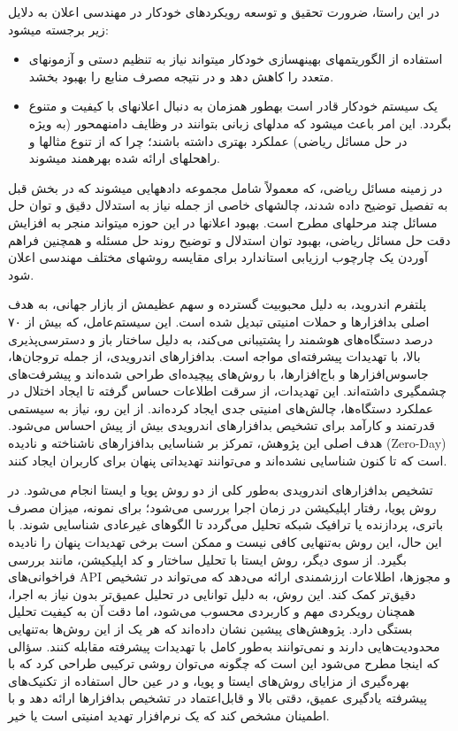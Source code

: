 در این راستا، ضرورت تحقیق و توسعه رویکردهای خودکار در مهندسی اعلان به دلایل زیر برجسته می\/شود:

\begin{itemize}
	\item استفاده از الگوریتم\/های بهینه\/سازی خودکار می\/تواند نیاز به تنظیم دستی و آزمون\/های متعدد را کاهش دهد و در نتیجه مصرف منابع را بهبود بخشد.
	\item یک سیستم خودکار قادر است به\/طور همزمان به دنبال اعلان\/های با کیفیت و متنوع بگردد. این امر باعث می\/شود که مدل\/های زبانی بتوانند در وظایف دامنه\/محور (به ویژه در حل مسائل ریاضی) عملکرد بهتری داشته باشند؛ چرا که از تنوع مثال\/ها و راه\/حل\/های ارائه شده بهره\/مند می\/شوند.
\end{itemize}

در زمینه مسائل ریاضی، که معمولاً شامل مجموعه داده\/هایی می\/شوند که در بخش قبل به تفصیل توضیح داده شدند، چالش\/های خاصی از جمله نیاز به استدلال دقیق و توان حل مسائل چند مرحله\/ای مطرح است. بهبود اعلان\/ها در این حوزه می\/تواند منجر به افزایش دقت حل مسائل ریاضی، بهبود توان استدلال و توضیح روند حل مسئله و همچنین فراهم آوردن یک چارچوب ارزیابی استاندارد برای مقایسه روش\/های مختلف مهندسی اعلان شود.

پلتفرم اندروید، به دلیل محبوبیت گسترده و سهم عظیمش از بازار جهانی، به هدف اصلی بدافزارها و حملات امنیتی تبدیل شده است. این سیستم‌عامل، که بیش از ۷۰ درصد دستگاه‌های هوشمند را پشتیبانی می‌کند، به دلیل ساختار باز و دسترسی‌پذیری بالا، با تهدیدات پیشرفته‌ای مواجه است. بدافزارهای اندرویدی، از جمله تروجان‌ها، جاسوس‌افزارها و باج‌افزارها، با روش‌های پیچیده‌ای طراحی شده‌اند و پیشرفت‌های چشمگیری داشته‌اند. این تهدیدات، از سرقت اطلاعات حساس گرفته تا ایجاد اختلال در عملکرد دستگاه‌ها، چالش‌های امنیتی جدی ایجاد کرده‌اند. از این رو، نیاز به سیستمی قدرتمند و کارآمد برای تشخیص بدافزارهای اندرویدی بیش از پیش احساس می‌شود. هدف اصلی این پژوهش، تمرکز بر شناسایی بدافزارهای ناشناخته و نادیده (Zero-Day) است که تا کنون شناسایی نشده‌اند و می‌توانند تهدیداتی پنهان برای کاربران ایجاد کنند.

تشخیص بدافزارهای اندرویدی به‌طور کلی از دو روش پویا و ایستا انجام می‌شود. در روش پویا، رفتار اپلیکیشن در زمان اجرا بررسی می‌شود؛ برای نمونه، میزان مصرف باتری، پردازنده یا ترافیک شبکه تحلیل می‌گردد تا الگوهای غیرعادی شناسایی شوند. با این حال، این روش به‌تنهایی کافی نیست و ممکن است برخی تهدیدات پنهان را نادیده بگیرد. از سوی دیگر، روش ایستا با تحلیل ساختار و کد اپلیکیشن، مانند بررسی فراخوانی‌های API و مجوزها، اطلاعات ارزشمندی ارائه می‌دهد که می‌تواند در تشخیص دقیق‌تر کمک کند. این روش، به دلیل توانایی در تحلیل عمیق‌تر بدون نیاز به اجرا، همچنان رویکردی مهم و کاربردی محسوب می‌شود، اما دقت آن به کیفیت تحلیل بستگی دارد. پژوهش‌های پیشین نشان داده‌اند که هر یک از این روش‌ها به‌تنهایی محدودیت‌هایی دارند و نمی‌توانند به‌طور کامل با تهدیدات پیشرفته مقابله کنند. سؤالی که اینجا مطرح می‌شود این است که چگونه می‌توان روشی ترکیبی طراحی کرد که با بهره‌گیری از مزایای روش‌های ایستا و پویا، و در عین حال استفاده از تکنیک‌های پیشرفته یادگیری عمیق، دقتی بالا و قابل‌اعتماد در تشخیص بدافزارها ارائه دهد و با اطمینان مشخص کند که یک نرم‌افزار تهدید امنیتی است یا خیر.

